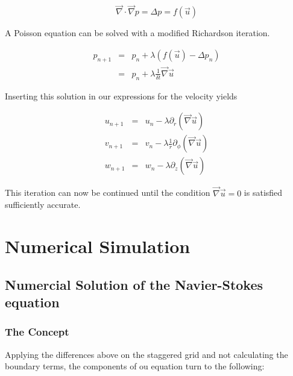 \documentclass[12pt, a4paper, twoside]{article}
\begin{document}
		\begin{equation}
			\vec{\nabla} \cdot \vec{\nabla} p = \Delta p = f(\vec{u})
			\label{eq:Poisson Pressure}
		\end{equation}
		
		A Poisson equation can be solved with a modified Richardson iteration. %
		
		\begin{eqnarray}
			p_{n+1} &=& p_n + \lambda \left(f(\vec{u}) - \Delta p_n\right)
			\nonumber \\
			&=& p_n + \lambda \frac{1}{\delta t} \vec{\nabla}\vec{u}
			\label{eq:Drucknachregelung p}
		\end{eqnarray}
		
		Inserting this solution in our expressions for the velocity yields
		
		\begin{eqnarray}
			u_{n+1} &=& u_n - \lambda \partial_r (\vec{\nabla}\vec{u}) \\
			v_{n+1} &=& v_n - \lambda \frac{1}{r} \partial_\phi (\vec{\nabla}\vec{u}) \\
			w_{n+1} &=& w_n - \lambda \partial_z (\vec{\nabla}\vec{u})
			\label{eq:Drucknachregelung uvw}
		\end{eqnarray}
		
		This iteration can now be continued until the condition $\vec{\nabla}\vec{u}=0$ is satisfied sufficiently accurate. 
		
	\newpage
\section{Numerical Simulation}
	\subsection{Numercial Solution of the Navier-Stokes equation}
		\subsubsection{The Concept}
			
			Applying the differences above on the staggered grid and not calculating the boundary terms, the components of ou equation turn to the following:
					
\end{document}
